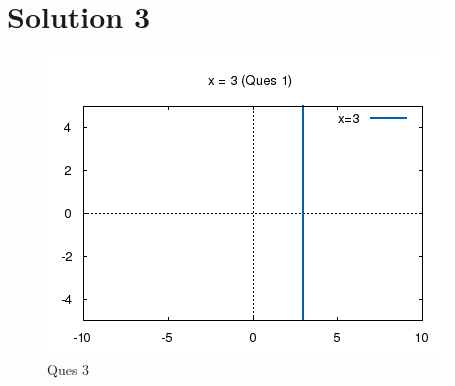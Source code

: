 \documentclass{article}
\begin{document}
\section{Solution 3}

\begin{figure}[!htb]
\centering
\includegraphics{./plots/one.png}
\caption{Ques 3}
\end{figure}
\end{document}
